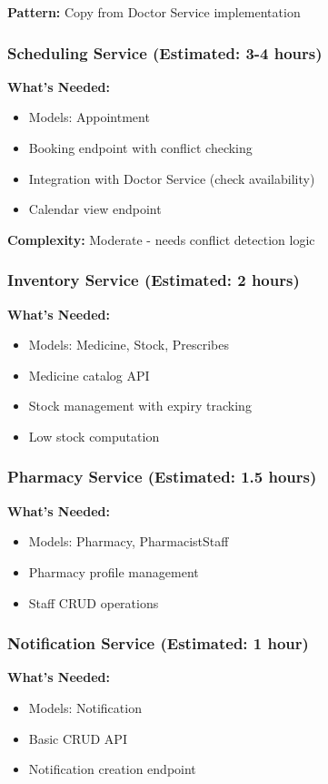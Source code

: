 \documentclass[12pt,a4paper]{article}
\begin{document}
\textbf{Pattern:} Copy from Doctor Service implementation

\subsubsection{Scheduling Service (Estimated: 3-4 hours)}
\textbf{What's Needed:}
\begin{itemize}
    \item Models: Appointment
    \item Booking endpoint with conflict checking
    \item Integration with Doctor Service (check availability)
    \item Calendar view endpoint
\end{itemize}

\textbf{Complexity:} Moderate - needs conflict detection logic

\subsubsection{Inventory Service (Estimated: 2 hours)}
\textbf{What's Needed:}
\begin{itemize}
    \item Models: Medicine, Stock, Prescribes
    \item Medicine catalog API
    \item Stock management with expiry tracking
    \item Low stock computation
\end{itemize}

\subsubsection{Pharmacy Service (Estimated: 1.5 hours)}
\textbf{What's Needed:}
\begin{itemize}
    \item Models: Pharmacy, PharmacistStaff
    \item Pharmacy profile management
    \item Staff CRUD operations
\end{itemize}

\subsubsection{Notification Service (Estimated: 1 hour)}
\textbf{What's Needed:}
\begin{itemize}
    \item Models: Notification
    \item Basic CRUD API
    \item Notification creation endpoint
\end{itemize}
\end{document}
